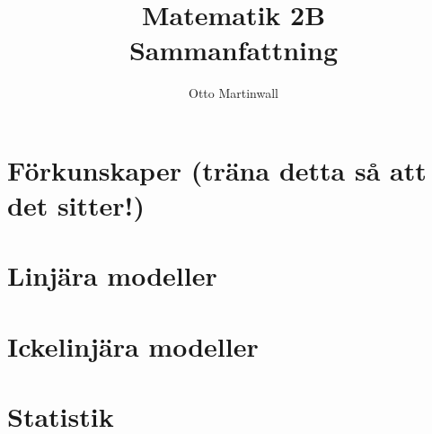 
\usepackage[swedish]{babel}

\title{Matematik 2B \\ Sammanfattning}
\author{Otto Martinwall}


\maketitle
\tableofcontents
\newpage



\section{Förkunskaper (träna detta så att det sitter!)}


\section{Linjära modeller}


\section{Ickelinjära modeller}


\section{Statistik}


